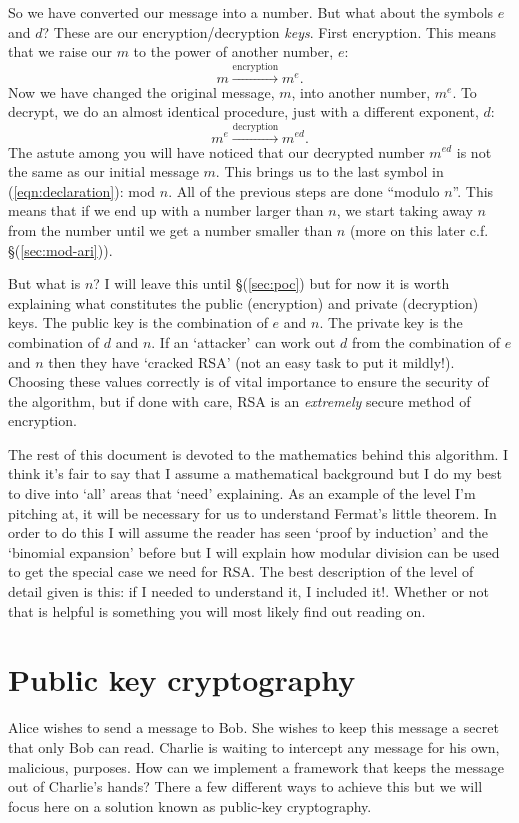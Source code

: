 \documentclass[]{scrartcl}
\theoremstyle{definition}
\renewcommand{\sec}[1]{\S \ref{#1}}
\let\oldref\ref
\renewcommand{\ref}[1]{(\oldref{#1})}
\begin{document}
So we have converted our message into a number. But what about the symbols $e$ and $d$? These are our encryption/decryption \textit{keys}. First encryption. This means that we raise our $m$ to the power of another number, $e$:
\begin{equation}
    m\xrightarrow{\text{encryption}}m^e.
\end{equation}
Now we have changed the original message, $m$, into another number, $m^e$. To decrypt, we do an almost identical procedure, just with a different exponent, $d$:
\begin{equation}
    m^e\xrightarrow{\text{decryption}}m^{ed}.
\end{equation}
The astute among you will have noticed that our decrypted number $m^{ed}$ is not the same as our initial message $m$. This brings us to the last symbol in \ref{eqn:declaration}: mod $n$. All of the previous steps are done ``modulo $n$''. This means that if we end up with a number larger than $n$, we start taking away $n$ from the number until we get a number smaller than $n$ (more on this later c.f. \sec{sec:mod-ari}).

But what is $n$? I will leave this until \sec{sec:poc} but for now it is worth explaining what constitutes the public (encryption) and private (decryption) keys. The public key is the combination of $e$ and $n$. The private key is the combination of  $d$ and $n$. If an `attacker' can work out $d$ from the combination of $e$ and $n$ then they have `cracked RSA' (not an easy task to put it mildly!). Choosing these values correctly is of vital importance to ensure the security of the algorithm, but if done with care, RSA is an \textit{extremely} secure method of encryption.

The rest of this document is devoted to the mathematics behind this algorithm. I think it's fair to say that I assume a mathematical background but I do my best to dive into `all' areas that `need' explaining. As an example of the level I'm pitching at, it will be necessary for us to understand Fermat's little theorem. In order to do this I will assume the reader has seen `proof by induction' and the `binomial expansion' before but I will explain how modular division can be used to get the special case we need for RSA. The best description of the level of detail given is this: if I needed to understand it, I included it!. Whether or not that is helpful is something you will most likely find out reading on.

\section{Public key cryptography}\label{sec:pkc}
Alice wishes to send a message to Bob. She wishes to keep this message a secret that only Bob can read. Charlie is waiting to intercept any message for his own, malicious, purposes. How can we implement a framework that keeps the message out of Charlie's hands? There a few different ways to achieve this but we will focus here on a solution known as public-key cryptography.
\end{document}
